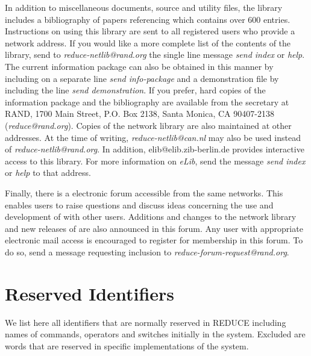 In addition to miscellaneous documents, source and utility files, the library
includes a bibliography of papers referencing {\REDUCE} which contains over
600 entries.  Instructions on using this library are sent to all registered
{\REDUCE} users who provide a network address.  If you would like a more
complete list of the contents of the library, send to
{\em reduce-netlib@rand.org} the single line message {\em send index} or
{\em help}.  The current {\REDUCE} information package can also be obtained
in this manner by including on a separate line {\em send info-package} and a
demonstration file by including the line {\em send demonstration}.  If you
prefer, hard copies of the information package and the bibliography are
available from the {\REDUCE} secretary at RAND, 1700 Main Street, P.O. Box
2138, Santa Monica, CA 90407-2138 ({\em reduce@rand.org}).  Copies of the
network library are also maintained at other addresses.  At the time of
writing, {\em reduce-netlib@can.nl} may also be used instead of
{\em reduce-netlib@rand.org}.  In addition, elib@elib.zib-berlin.de provides
interactive access to this library.  For more information on {\em eLib},
send the message {\em send index} or {\em help} to that address.

Finally, there is a {\REDUCE} electronic forum accessible from the same
networks.  This enables {\REDUCE} users to raise questions and discuss ideas
concerning the use and development of {\REDUCE} with other users.  Additions
and changes to the network library and new releases of {\REDUCE} are also
announced in this forum.  Any user with appropriate electronic mail access is
encouraged to register for membership in this forum.  To do so, send a
message requesting inclusion to {\em reduce-forum-request@rand.org}.

\appendix
\chapter{Reserved Identifiers}

We list here all identifiers that are normally reserved in REDUCE
including names of commands, operators and switches initially in the system.
Excluded are words that are reserved in specific implementations of the
system. \\ \\

